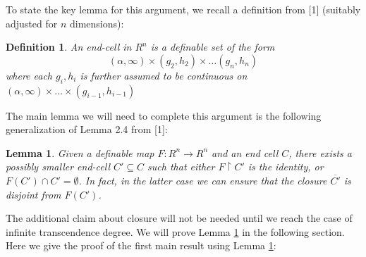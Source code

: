 \documentclass[10pt,a4paper]{amsart}
\newtheorem{lemma}[theorem]{Lemma}
\newtheorem{definition}[theorem]{Definition}
\begin{document}
To state the key lemma for this argument, we recall a definition from [1] (suitably adjusted for $n$ dimensions):
\begin{definition}
    An end-cell in $R^n$ is a definable set of the form 
    \[(\alpha,\infty)\times(g_2,h_2)\times\dots( g_n,h_n)\]
    where each $g_i,h_i$ is further assumed to be continuous on $(\alpha,\infty)\times\dots\times(g_{i-1},h_{i-1})$
\end{definition}

The main lemma we will need to complete this argument is the following generalization of Lemma 2.4 from [1]:

\begin{lemma}\label{MainLemma} Given a definable map $F:R^n\to R^n$ and an end cell $C$, there exists a possibly smaller end-cell $C'\subseteq C$ such that either $F\upharpoonright C'$ is the identity, or $F(C')\cap C'=\emptyset$. In fact, in the latter case we can ensure that the closure $\overline{C'}$ is disjoint from $F(C')$.
\end{lemma}

The additional claim about closure will not be needed until we reach the case of infinite transcendence degree. We will prove Lemma \ref{MainLemma} in the following section. Here we give the proof of the first main result using Lemma \ref{MainLemma}:
\end{document}
